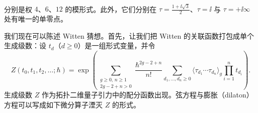\begin{enumerate}[label=(\arabic*),start=2]
\begin{align}
\end{align}
分别是权 $4$、$6$、$12$ 的模形式。此外，它们分别在 $\tau=\frac{1+\ii\sqrt3}{2}$、$\tau=\ii$ 与 $\tau=+\ii\infty$ 处有唯一的单零点。
\end{enumerate}

我们现在可以陈述 Witten 猜想。首先，让我们把 Witten 的关联函数打包成单个生成级数：设 $t_d$（$d\ge0$）是一组形式变量，并令
\begin{equation}
Z(t_0,t_1,t_2,\ldots;\hbar)=\exp\left(\sum_{\substack{g\ge0,\,n\ge1\\ 2g-2+n>0}}\frac{\hbar^{2g-2+n}}{n!}\sum_{d_1,\ldots,d_n\ge0}\langle\tau_{d_1}\cdots\tau_{d_n}\rangle_g\prod_{i=1}^{n}t_{d_i}\right). \tag{2.63}
\end{equation}
生成级数 $Z$ 作为拓扑二维量子引力中的配分函数出现。弦方程与膨胀（dilaton）方程可以写成如下微分算子湮灭 $Z$ 的形式。

